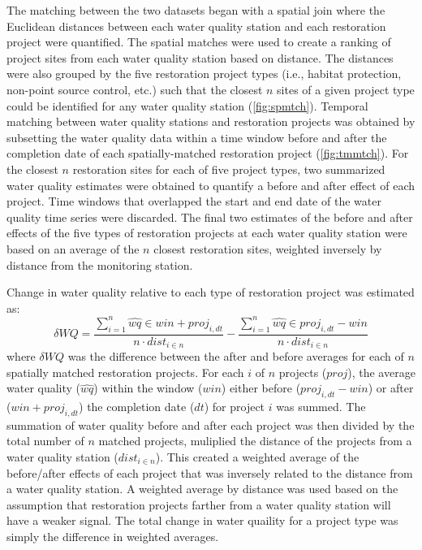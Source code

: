 \documentclass[]{article}
\begin{document}
The matching between the two datasets began with a spatial join where
the Euclidean distances between each water quality station and each
restoration project were quantified. The spatial matches were used to
create a ranking of project sites from each water quality station based
on distance. The distances were also grouped by the five restoration
project types (i.e., habitat protection, non-point source control, etc.)
such that the closest \(n\) sites of a given project type could be
identified for any water quality station (\cref{fig:spmtch}). Temporal
matching between water quality stations and restoration projects was
obtained by subsetting the water quality data within a time window
before and after the completion date of each spatially-matched
restoration project (\cref{fig:tmmtch}). For the closest \(n\)
restoration sites for each of five project types, two summarized water
quality estimates were obtained to quantify a before and after effect of
each project. Time windows that overlapped the start and end date of the
water quality time series were discarded. The final two estimates of the
before and after effects of the five types of restoration projects at
each water quality station were based on an average of the \(n\) closest
restoration sites, weighted inversely by distance from the monitoring
station.

Change in water quality relative to each type of restoration project was
estimated as: \begin{equation}
\delta WQ = \frac{\sum_{i = 1}^{n} \hat{wq} \in win + proj_{i, dt}}{n \cdot dist_{i \in n}} - \frac{\sum_{i = 1}^{n} \hat{wq} \in proj_{i, dt} - win}{n \cdot dist_{i \in n}}
\label{eq:wqdif}
\end{equation} where \(\delta WQ\) was the difference between the after
and before averages for each of \(n\) spatially matched restoration
projects. For each \(i\) of \(n\) projects (\(proj\)), the average water
quality (\(\hat{wq}\)) within the window (\(win\)) either before
(\(proj_{i, dt} - win\)) or after (\(win + proj_{i, dt}\)) the
completion date (\(dt\)) for project \(i\) was summed. The summation of
water quality before and after each project was then divided by the
total number of \(n\) matched projects, muliplied the distance of the
projects from a water quality station (\(dist_{i \in n}\)). This created
a weighted average of the before/after effects of each project that was
inversely related to the distance from a water quality station. A
weighted average by distance was used based on the assumption that
restoration projects farther from a water quality station will have a
weaker signal. The total change in water quaility for a project type was
simply the difference in weighted averages.
\end{document}
